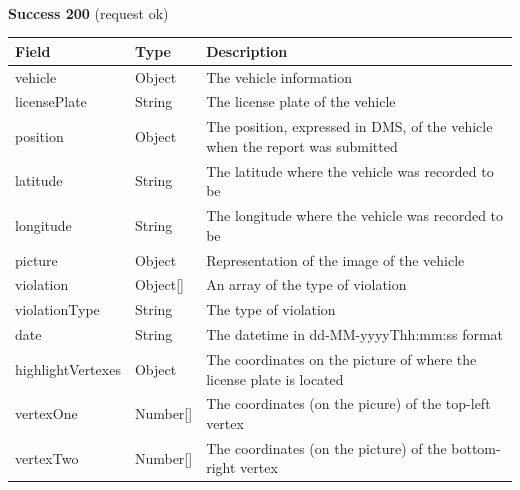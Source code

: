 						\paragraph{}
							\textbf{Success 200} (request ok)
							\begin{table}[!h]
								\begin{tabular}{L{0.23\textwidth}L{0.15\textwidth}L{0.42\textwidth}}
									\toprule
									Field & Type & Description \\
									\midrule
								 	vehicle & Object & The vehicle information \\
								 	\hspace{2.5mm}licensePlate & String & The license plate of the vehicle \\
								 	position & Object & The position, expressed in DMS, of the vehicle when the report was submitted  \\
								 	\hspace{2.5mm}latitude & String & The latitude where the vehicle was recorded to be \\
								 	\hspace{3mm}longitude & String & The longitude where the vehicle was recorded to be \\
								 	picture & Object & Representation of the image of the vehicle \\
								 	violation & Object[] & An array of the type of violation \\
								 	\hspace{2.5mm}violationType & String & The type of violation \\
								 	date & String & The datetime in \newline dd-MM-yyyyThh:mm:ss format \\
								 	highlightVertexes & Object & The coordinates on the picture of where the license plate is located \\
								 	\hspace{2.5mm}vertexOne & Number[] & The coordinates (on the picure) of the top-left vertex \\
								 	\hspace{2.5mm}vertexTwo & Number[] & The coordinates (on the picture) of the bottom-right vertex \\
								 	\bottomrule
								\end{tabular}
							\end{table}
